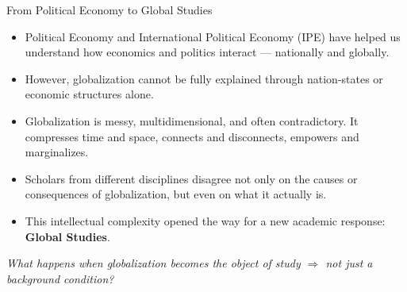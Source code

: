 \documentclass{beamer}
\begin{document}
\begin{frame}{From Political Economy to Global Studies}
\small
\begin{itemize}
    \item Political Economy and International Political Economy (IPE) have helped us understand how economics and politics interact — nationally and globally.
    
    \item However, globalization cannot be fully explained through nation-states or economic structures alone.

    \item Globalization is messy, multidimensional, and often contradictory. It compresses time and space, connects and disconnects, empowers and marginalizes.

    \item Scholars from different disciplines disagree not only on the causes or consequences of globalization, but even on what it actually is.

    \item This intellectual complexity opened the way for a new academic response: \textbf{Global Studies}.
\end{itemize}

\centering
\textit{What happens when globalization becomes the object of study $\Rightarrow$ not just a background condition?}

\end{frame}
\end{document}
